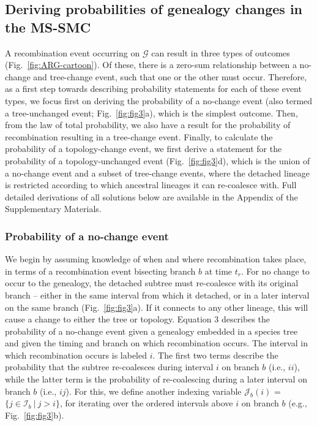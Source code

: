 \documentclass[11pt]{article}
\begin{document}
\subsection{Deriving probabilities of genealogy changes in the MS-SMC}
A recombination event occurring on $\mathcal{G}$ can result 
in three types of outcomes (Fig.~\ref{fig:ARG-cartoon}).
Of these, there is a zero-sum relationship between a no-change and 
tree-change event, such that one or the other must occur.
Therefore, as a first step towards describing probability statements 
for each of these event types, we focus first on deriving the 
probability of a no-change event 
(also termed a tree-unchanged event; Fig.~\ref{fig:fig3}a),
which is the simplest outcome. Then, from the law of total probability, 
we also have a result for the probability of recombination resulting in 
a tree-change event. 
Finally, to calculate the probability of a topology-change event, 
we first derive a statement for the probability of a topology-unchanged event
(Fig.~\ref{fig:fig3}d), which is the union of a no-change event and
a subset of tree-change events,
where the detached lineage is restricted according to which ancestral lineages 
it can re-coalesce with. 
Full detailed derivations of all solutions below are available in the 
Appendix of the Supplementary Materials.


\subsubsection{Probability of a no-change event}
We begin by assuming knowledge of when and where recombination takes place, in terms 
of a recombination event bisecting branch $b$ at time $t_r$. 
For no change to occur to the genealogy, the detached subtree must re-coalesce with 
its original branch -- either in the same interval from which it detached, or in a
later interval on the same branch (Fig.~\ref{fig:fig3}a).
If it connects to any other lineage, this will cause a change to either the tree 
or topology. 
Equation 3 describes the probability of a no-change event 
given a genealogy embedded in a species tree and given the timing and branch on 
which recombination occurs. The interval in which recombination occurs 
is labeled $i$. 
The first two terms describe the probability that the subtree re-coalesces 
during interval $i$ on branch $b$ (i.e., $ii$), 
while the latter term is the probability of re-coalescing
during a later interval on branch $b$ (i.e., $ij$). For this, we define 
another indexing variable $\mathcal{J}_b(i)$ = $\{j \in \mathcal{I}_b ~|~ j > i\}$, 
for iterating over the ordered intervals above $i$ on branch $b$ (e.g., Fig.~\ref{fig:fig3}b).
\end{document}
